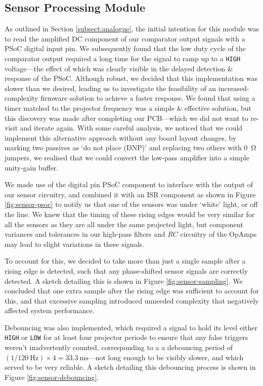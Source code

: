\documentclass[conference]{IEEEtran}
\begin{document}
\subsection{Sensor Processing Module}

As outlined in Section \ref{subsect:analogue}, the initial intention for this module was to read the amplified DC component of our comparator output signals with a PSoC digital input pin.
We subsequently found that the low duty cycle of the comparator output required a long time for the signal to ramp up to a \texttt{HIGH} voltage—the effect of which was clearly visible in the delayed detection \& response of the PSoC.
Although robust, we decided that this implementation was slower than we desired, leading us to investigate the feasibility of an increased-complexity firmware solution to achieve a faster response.
We found that using a timer matched to the projector frequency was a simple \& effective solution, but this discovery was made after completing our PCB—which we did not want to re-visit and iterate again.
With some careful analysis, we noticed that we could implement this alternative approach without any board layout changes, by marking two passives as `do not place (DNP)' and replacing two others with \qty{0}{\ohm} jumpers, we realised that we could convert the low-pass amplifier into a simple unity-gain buffer.

We made use of the digital pin PSoC component to interface with the output of our sensor circuitry, and combined it with an ISR component as shown in Figure \ref{fig:sensor-psoc} to notify us that one of the sensors was under `white' light, or off the line.
We knew that the timing of these rising edges would be very similar for all the sensors as they are all under the same projected light, but component variances and tolerances in our high-pass filters and $RC$ circuitry of the OpAmps may lead to slight variations in these signals.

To account for this, we decided to take more than just a single sample after a rising edge is detected, such that any phase-shifted sensor signals are correctly detected.
A sketch detailing this is shown in Figure \ref{fig:sensor-sampling}.
We concluded that one extra sample after the rising edge was sufficient to account for this, and that excessive sampling introduced unneeded complexity that negatively affected system performance.

Debouncing was also implemented, which required a signal to hold its level either \texttt{HIGH} or \texttt{LOW} for at least four projector periods to ensure that any false triggers weren't inadvertently counted, corresponding to a a debouncing period of $\left(1 / \qty{120}{\hertz}\right) \times 4 = \qty{33.3}{\ms}$—not long enough to be visibly slower, and which served to be very reliable.
A sketch detailing this debouncing process is shown in Figure \ref{fig:sensor-debouncing}.
\end{document}
